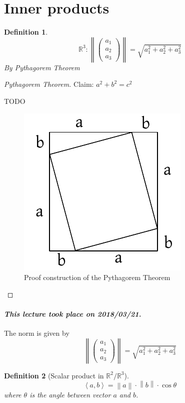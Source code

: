 \documentclass{article}
\newtheorem{definition}{Definition}  \numberwithin{definition}{section}
\newcommand{\angel}[1]{\left\langle#1\right\rangle}
\newcommand{\norm}[1]{\left\|#1\right\|}
\newcommand{\dateref}[1]{\paragraph{\textit{This lecture took place on #1.}}}
\begin{document}
\section{Inner products}

\begin{definition} %
  \[ \mathbb R^3: \norm{\begin{pmatrix} a_1 \\ a_2 \\ a_3 \end{pmatrix}} = \sqrt{a_1^2 + a_2^2 + a_3^2} \]
  By Pythagorem Theorem
\end{definition}

\begin{proof}[Pythagorem Theorem]
  Claim: $a^2 + b^2 = c^2$

  TODO

  \begin{figure}[!h]
    \begin{center}
      \includegraphics{img/03_pytha.pdf}
      \caption{Proof construction of the Pythagorem Theorem}
      \label{fig:pytha}
    \end{center}
  \end{figure}
\end{proof}

\dateref{2018/03/21}

The norm is given by
\[ \norm{\begin{pmatrix} a_1 \\ a_2 \\ a_3 \end{pmatrix}} = \sqrt{a_1^2 + a_2^2 + a_3^2} \]

\begin{definition}[Scalar product in $\mathbb R^2/\mathbb R^3$]
  \[ \angel{a, b} = \norm{a} \cdot \norm{b} \cdot \cos{\theta} \]
  where $\theta$ is the angle between vector $a$ and $b$.
\end{definition}
\end{document}
